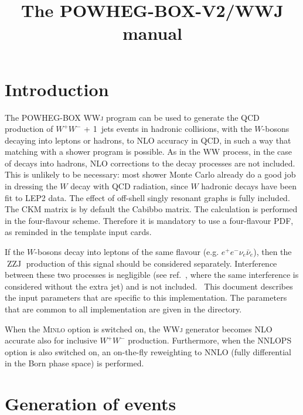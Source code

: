 \documentclass{paper}
\newcommand{\tmop}[1]{\ensuremath{\operatorname{#1}}}
\newcommand{\tmtexttt}[1]{{\ttfamily{#1}}}
\newcommand{\noun}[1]{\textsc{#1}}
\newcommand{\WW}{\noun{WW}}
\newcommand{\WWJ}{\noun{WWj}}
\newcommand{\MINLO}{\noun{Minlo}}
\newcommand{\NNLOPS}{\noun{NNLOPS}}
\begin{document}
\title{The POWHEG-BOX-V2/WWJ manual}

\maketitle

\section{Introduction}

The POWHEG-BOX \WWJ{} program {\cite{Hamilton:2016bfu}} can be used to
generate the QCD production of $W^+ W^-$ + 1~jets events in hadronic
collisions, with the $W$-bosons decaying into leptons or hadrons, to
NLO accuracy in QCD, in such a way that matching with a shower program
is possible. As in the \WW{} process, in the case of decays into
hadrons, NLO corrections to the decay processes are not included. This
is unlikely to be necessary: most shower Monte Carlo already do a good
job in dressing the $W$ decay with QCD radiation, since $W$ hadronic
decays have been fit to LEP2 data. The effect of off-shell singly
resonant graphs is fully included. The CKM matrix is by default the
Cabibbo matrix. The calculation is performed in the four-flavour
scheme. Therefore it is mandatory to use a four-flavour PDF, as
reminded in the template input cards.

If the $W$-bosons decay into leptons of the same flavour (e.g. $e^+
e^- \nu_e \bar{\nu}_e$), then the $\tmop{ZZJ}$ production of this
signal should be considered separately. Interference between these two
processes is negligible (see ref.~\cite{Melia:2011tj}, where the same
interference is considered without the extra jet) and is not
included. \ This document describes the input parameters that are
specific to this implementation. The parameters that are common to all
\tmtexttt{POWHEG BOX} implementation are given in the
\tmtexttt{POWHEG-BOX-V2/Docs} directory.

When the \MINLO{} option is switched on, the \WWJ{} generator becomes
NLO accurate also for inclusive $W^+ W^-$ production. Furthermore,
when the \NNLOPS{} option is also switched on, an on-the-fly
reweighting to NNLO (fully differential in the Born phase space) is
performed.

\section{Generation of events}
\end{document}

